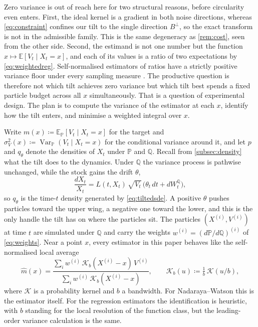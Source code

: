 \documentclass[11pt,a4paper]{article}
\theoremstyle{plain}
\theoremstyle{definition}
\theoremstyle{definition}
\newcommand{\E}{\mathbb{E}}
\newcommand{\Pm}{\mathbb{P}}
\newcommand{\Qm}{\mathbb{Q}}
\newcommand{\Lev}{L}
\begin{document}
Zero variance is out of reach here for two structural reasons, before circularity even enters. First, the ideal kernel is a gradient in both noise directions, whereas \cref{eq:constraint} confines our tilt to the single direction $B^\perp$, so the exact transform is not in the admissible family. This is the same degeneracy as \cref{rem:cost}, seen from the other side. Second, the estimand is not one number but the function $x \mapsto \E[V_t \mid X_t = x]$, and each of its values is a ratio of two expectations by \cref{eq:weightedreg}. Self-normalised estimators of ratios have a strictly positive variance floor under every sampling measure \citep{owen2000}. The productive question is therefore not which tilt achieves zero variance but which tilt best spends a fixed particle budget across all $x$ simultaneously. That is a question of experimental design. The plan is to compute the variance of the estimator at each $x$, identify how the tilt enters, and minimise a weighted integral over $x$.

Write $m(x) \coloneqq \E_{\Pm}[V_t \mid X_t = x]$ for the target and $\sigma_V^2(x) \coloneqq \operatorname{Var}_{\Pm}(V_t \mid X_t = x)$ for the conditional variance around it, and let $p$ and $q_\theta$ denote the densities of $X_t$ under $\Pm$ and $\Qm$. Recall from \cref{subsec:density} what the tilt does to the dynamics. Under $\Qm$ the variance process is pathwise unchanged, while the stock gains the drift $\theta$,
\begin{equation}\label{eq:tiltedsde}
  \frac{dX_t}{X_t} = \Lev(t, X_t)\,\sqrt{V_t}\,\bigl( \theta_t\,dt + dW^{\Qm}_t \bigr),
\end{equation}
so $q_\theta$ is the time-$t$ density generated by \cref{eq:tiltedsde}. A positive $\theta$ pushes particles toward the upper wing, a negative one toward the lower, and this is the only handle the tilt has on where the particles sit. The particles $(X^{(i)}, V^{(i)})$ at time $t$ are simulated under $\Qm$ and carry the weights $w^{(i)} = (d\Pm/d\Qm)^{(i)}$ of \cref{eq:weights}. Near a point $x$, every estimator in this paper behaves like the self-normalised local average
\begin{equation}\label{eq:ratioest}
  \widehat m(x) = \frac{\sum_i w^{(i)}\, \mathcal{K}_b(X^{(i)} - x)\, V^{(i)}}{\sum_i w^{(i)}\, \mathcal{K}_b(X^{(i)} - x)},
  \qquad \mathcal{K}_b(u) \coloneqq \tfrac{1}{b}\,\mathcal{K}(u/b),
\end{equation}
where $\mathcal{K}$ is a probability kernel and $b$ a bandwidth. For Nadaraya--Watson this is the estimator itself. For the regression estimators the identification is heuristic, with $b$ standing for the local resolution of the function class, but the leading-order variance calculation is the same.
\end{document}
